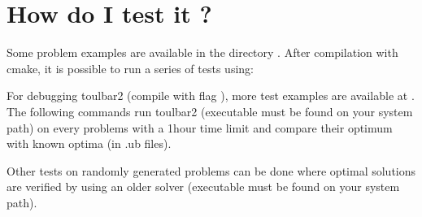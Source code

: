 \documentclass[letterpaper,10pt,openany,oneside,english]{sphinxmanual}
\begin{document}
\section{How do I test it ?}
\label{\detokenize{userdoc:how-do-i-test-it}}
\sphinxAtStartPar
Some problem examples are available in the directory . After compilation with cmake, it is possible to run a series of tests using:

\begin{sphinxVerbatim}[commandchars=\\\{\}]
 
\end{sphinxVerbatim}

\sphinxAtStartPar
For debugging toulbar2 (compile with flag ), more test examples are available at .
The following commands run toulbar2 (executable must be found on your system path) on every problems with a 1\sphinxhyphen{}hour time limit and compare their optimum with known optima (in .ub files).

\begin{sphinxVerbatim}[commandchars=\\\{\}]
 
  
 
\end{sphinxVerbatim}

\sphinxAtStartPar
Other tests on randomly generated problems can be done where optimal solutions are verified by using an older solver  (executable must be found on your system path).

\begin{sphinxVerbatim}[commandchars=\\\{\}]
 
  
 
 
 
\end{sphinxVerbatim}
\end{document}
